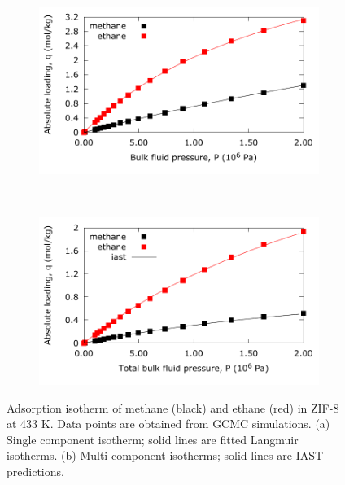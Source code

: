 \documentclass{article}
\begin{document}
\begin{figure}[h!]
\centering
\begin{subfigure}[h]{0.5\textwidth}
\centering
\includegraphics[width=1.0\textwidth]{./../adsorption_isotherms/singlecomponent_zif_methane_ethane_433K.pdf}
\subcaption{}
\end{subfigure}~
\begin{subfigure}[h]{0.5\textwidth}
\centering
\includegraphics[width=1.0\textwidth]{./../adsorption_isotherms/multicomponent_zif_methane_ethane_433K.pdf}
\subcaption{}
\end{subfigure}
\caption{Adsorption isotherm of methane (black) and ethane (red) in ZIF-8 at 433 K. Data points are obtained from GCMC simulations. (a) Single component isotherm; solid lines are fitted Langmuir isotherms. (b) Multi component isotherms; solid lines are IAST predictions.}
\label{fig:single_component_isotherms}
\end{figure}

\clearpage
\end{document}
